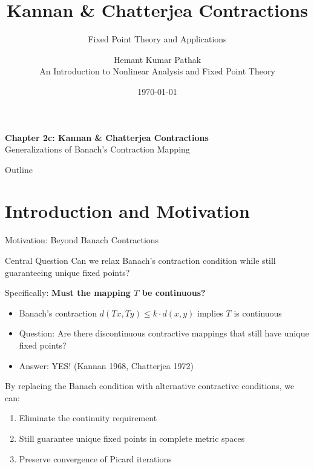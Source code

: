 \documentclass[aspectratio=169,10pt]{beamer}
\title[Kannan \& Chatterjea Contractions]{Kannan \& Chatterjea Contractions}
\subtitle{Fixed Point Theory and Applications}
\author[Pathak]{Hemant Kumar Pathak\\An Introduction to Nonlinear Analysis and Fixed Point Theory}
\date{\today}
\institute{Lecture Notes on Nonlinear Analysis}
\begin{document}
\begin{frame}
    \titlepage
    \vspace{0.5cm}
    \begin{center}
        \textbf{Chapter 2c: Kannan \& Chatterjea Contractions}\\
        Generalizations of Banach's Contraction Mapping
    \end{center}
\end{frame}

\begin{frame}[allowframebreaks]{Outline}
    \tableofcontents
\end{frame}

\section{Introduction and Motivation}

\begin{frame}{Motivation: Beyond Banach Contractions}
    \begin{block}{Central Question}
        Can we relax Banach's contraction condition while still guaranteeing unique fixed points?
    \end{block}

    \vspace{0.3cm}
    Specifically: \textbf{Must the mapping $T$ be continuous?}

    \vspace{0.4cm}
    \begin{itemize}
        \item Banach's contraction $d(Tx, Ty) \leq k \cdot d(x,y)$ implies $T$ is continuous
        \item Question: Are there discontinuous contractive mappings that still have unique fixed points?
        \item Answer: YES! (Kannan 1968, Chatterjea 1972)
    \end{itemize}

    \vspace{0.3cm}
    \begin{definition}
        By replacing the Banach condition with alternative contractive conditions, we can:
        \begin{enumerate}
            \item Eliminate the continuity requirement
            \item Still guarantee unique fixed points in complete metric spaces
            \item Preserve convergence of Picard iterations
        \end{enumerate}
    \end{definition}
\end{frame}
\end{document}
